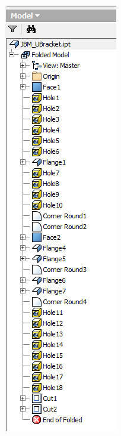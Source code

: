 \begin{minipage}{\linewidth}
\begin{minipage}[c]{0.3\linewidth}
\includegraphics[width=\linewidth,valign=t]{images/JBM_UBracket_origpart_tree}
 \label{fig:results:JBM_UBracket_origpart_tree}
\end{minipage}
\end{minipage}

